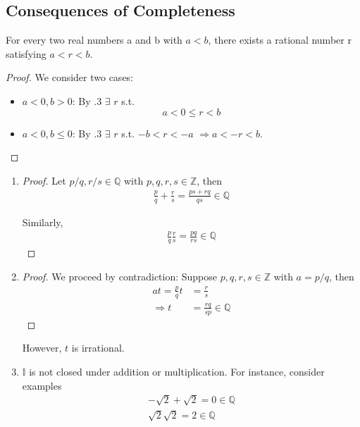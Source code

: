 \subsection{Consequences of Completeness}

\begin{theorem}
    For every two real numbers a and b
    with $a<b$, there exists a rational number r satisfying $a<r<b$.
\end{theorem}
\begin{proof}
    We consider two cases:
    \begin{itemize}
        \item $a < 0, b > 0$:
        By .3 $\exists$ $r$ s.t.
        \begin{equation*}
            a < 0 \leq r < b
        \end{equation*}

        \item $a<0, b \leq 0$:
        By .3 $\exists$ $r$ s.t. $-b < r < -a$ 
        $\Rightarrow a < -r < b$.
    \end{itemize}
\end{proof}

\begin{enumerate}[label=(\alph*)]
    \item 
    \begin{proof}
        Let $p/q, r/s \in \mathbb{Q}$ with $p, q, r, s \in \mathbb{Z}$, then
        \begin{align*}
            \frac{p}{q} + \frac{r}{s} = \frac{ps+rq}{qs} \in \mathbb{Q}
        \end{align*}

        Similarly,
        \begin{align*}
            \frac{p}{q} \frac{r}{s} = \frac{pq}{rs} \in \mathbb{Q}
        \end{align*}
    \end{proof}

    \item 
    \begin{proof}
        We proceed by contradiction:
        Suppose $p,q,r,s \in \mathbb{Z}$ with $a=p/q$, then
        \begin{align*}
            at = \frac{p}{q}t   &= \frac{r}{s} \\
                  \Rightarrow t &= \frac{rq}{sp} \in \mathbb{Q} 
        \end{align*}
    \end{proof}
    However, $t$ is irrational.

    \item 
    $\mathbb{I}$ is not closed under addition or multiplication.
    For instance, consider examples
    \begin{align*}
        - \sqrt 2 + \sqrt 2 = 0 \in \mathbb{Q} \\
        \sqrt 2 \sqrt 2 = 2 \in \mathbb{Q} 
    \end{align*}
\end{enumerate}


